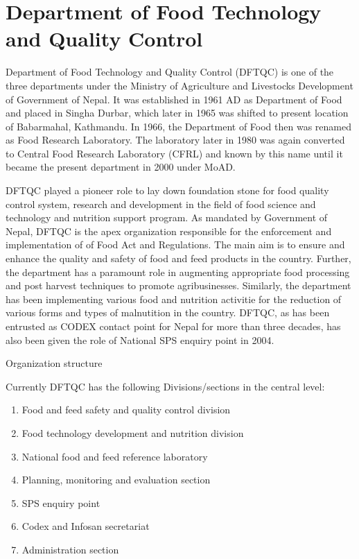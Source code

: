 \documentclass[
  openany]{book}
\providecommand{\tightlist}{%
  \setlength{\itemsep}{0pt}\setlength{\parskip}{0pt}}
\begin{document}
\hypertarget{department-of-food-technology-and-quality-control}{%
\section{Department of Food Technology and Quality Control}\label{department-of-food-technology-and-quality-control}}

Department of Food Technology and Quality Control (DFTQC) is one of the three departments under the Ministry of Agriculture and Livestocks Development of Government of Nepal. It was established in 1961 AD as Department of Food and placed in Singha Durbar, which later in 1965 was shifted to present location of Babarmahal, Kathmandu. In 1966, the Department of Food then was renamed as Food Research Laboratory. The laboratory later in 1980 was again converted to Central Food Research Laboratory (CFRL) and known by this name until it became the present department in 2000 under MoAD.

DFTQC played a pioneer role to lay down foundation stone for food quality control system, research and development in the field of food science and technology and nutrition support program. As mandated by Government of Nepal, DFTQC is the apex organization responsible for the enforcement and implementation of of Food Act and Regulations. The main aim is to ensure and enhance the quality and safety of food and feed products in the country. Further, the department has a paramount role in augmenting appropriate food processing and post harvest techniques to promote agribusinesses. Similarly, the department has been implementing various food and nutrition activitie for the reduction of various forms and types of malnutition in the country. DFTQC, as has been entrusted as CODEX contact point for Nepal for more than three decades, has also been given the role of National SPS enquiry point in 2004.

Organization structure

Currently DFTQC has the following Divisions/sections in the central level:

\begin{enumerate}
\def\labelenumi{\arabic{enumi}.}
\tightlist
\item
  Food and feed safety and quality control division
\item
  Food technology development and nutrition division
\item
  National food and feed reference laboratory
\item
  Planning, monitoring and evaluation section
\item
  SPS enquiry point
\item
  Codex and Infosan secretariat
\item
  Administration section
\end{enumerate}
\end{document}
